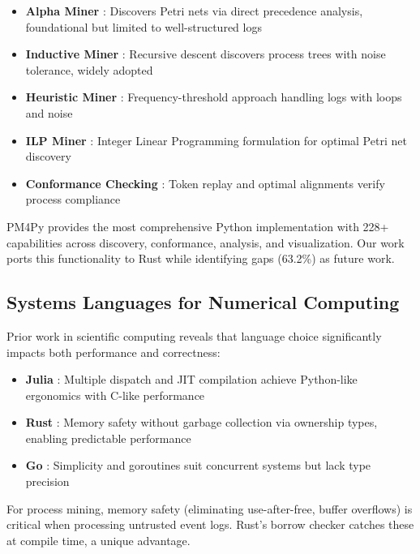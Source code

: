 \documentclass[11pt,twocolumn]{article}
\begin{document}
\begin{itemize}
    \item \textbf{Alpha Miner} \cite{aalst2004workflow}: Discovers Petri nets via direct precedence analysis, foundational but limited to well-structured logs
    \item \textbf{Inductive Miner} \cite{leemans2013discovering}: Recursive descent discovers process trees with noise tolerance, widely adopted
    \item \textbf{Heuristic Miner} \cite{weijters2006mining}: Frequency-threshold approach handling logs with loops and noise
    \item \textbf{ILP Miner} \cite{van2008mining}: Integer Linear Programming formulation for optimal Petri net discovery
    \item \textbf{Conformance Checking} \cite{adriansyah2011conformance}: Token replay and optimal alignments verify process compliance
\end{itemize}

PM4Py \cite{pm4py2020} provides the most comprehensive Python implementation with 228+ capabilities across discovery, conformance, analysis, and visualization. Our work ports this functionality to Rust while identifying gaps (63.2\%) as future work.

\subsection{Systems Languages for Numerical Computing}
Prior work in scientific computing reveals that language choice significantly impacts both performance and correctness:

\begin{itemize}
    \item \textbf{Julia} \cite{bezanson2017julia}: Multiple dispatch and JIT compilation achieve Python-like ergonomics with C-like performance
    \item \textbf{Rust} \cite{matsakis2014rust}: Memory safety without garbage collection via ownership types, enabling predictable performance
    \item \textbf{Go} \cite{donovan2015go}: Simplicity and goroutines suit concurrent systems but lack type precision
\end{itemize}

For process mining, memory safety (eliminating use-after-free, buffer overflows) is critical when processing untrusted event logs. Rust's borrow checker catches these at compile time, a unique advantage.
\end{document}
